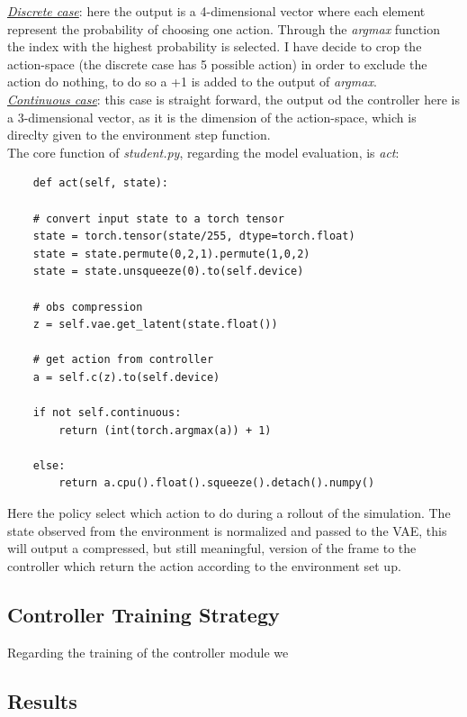 \documentclass[10pt,a4paper]{article}
\begin{document}
\underline{\textit{Discrete case}}: here the output is a 4-dimensional vector where each element represent the probability of choosing one action. Through the \textit{argmax} function the index with the highest probability is selected. I have decide to crop the action-space (the discrete case has 5 possible action) in order to exclude the action do nothing, to do so a +1 is added to the output of \textit{argmax}.\\

\underline{\textit{Continuous case}}: this case is straight forward, the output od the controller here is a 3-dimensional vector, as it is the dimension of the action-space, which is direclty given to the environment step function.\\

\noindent The core function of \textit{student.py}, regarding the model evaluation, is \textit{act}:
\begin{lstlisting}
    def act(self, state):

    # convert input state to a torch tensor
    state = torch.tensor(state/255, dtype=torch.float)
    state = state.permute(0,2,1).permute(1,0,2)
    state = state.unsqueeze(0).to(self.device)

    # obs compression
    z = self.vae.get_latent(state.float())
    
    # get action from controller
    a = self.c(z).to(self.device)   

    if not self.continuous:
        return (int(torch.argmax(a)) + 1)
    
    else:
        return a.cpu().float().squeeze().detach().numpy()
\end{lstlisting}

Here the policy select which action to do during a rollout of the simulation. The state observed from the environment is normalized and passed to the VAE, this will output a compressed, but still meaningful, version of the frame to the controller which return the action according to the environment set up.

\subsection{Controller Training Strategy}
Regarding the training of the controller module we 


\newpage

\subsection{Results}
\newpage

\newpage


\printbibliography

\end{document}
